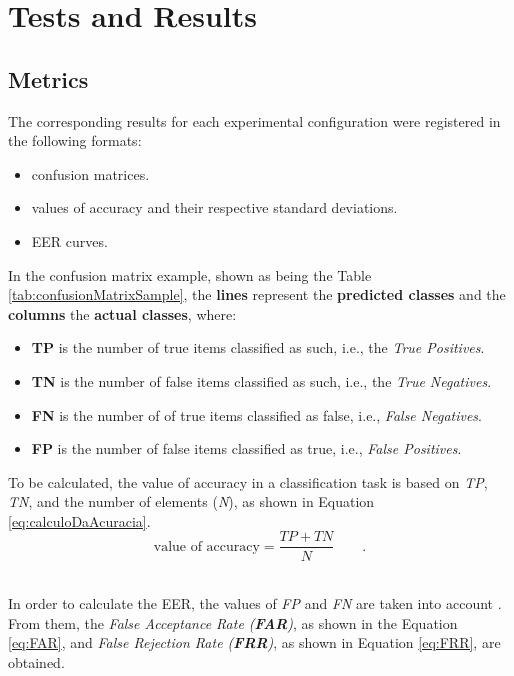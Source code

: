 \section{Tests and Results}
\label{sec:testsResults}
\subsection{Metrics}
\par The corresponding results for each experimental configuration were registered in the following formats:
		\begin{itemize}
			\item{} confusion matrices.
			\item{} values of accuracy and their respective standard deviations.
			\item{} EER curves.
		\end{itemize}
\par In the confusion matrix example, shown as being the Table \ref{tab:confusionMatrixSample}, the \textbf{lines} represent the \textbf{predicted classes} and the \textbf{columns} the \textbf{actual classes}, where:
\begin{itemize}
			\item{}\textbf{TP} is the number of true items classified as such, i.e., the \textit{True Positives}.
			\item{}\textbf{TN} is the number of false items classified as such, i.e., the \textit{True Negatives}.
			\item{}\textbf{FN} is the number of of true items classified as false, i.e., \textit{False Negatives}.
			\item{}\textbf{FP} is the number of false items classified as true, i.e., \textit{False Positives}.
		\end{itemize}

To be calculated, the value of accuracy in a classification task is based on \textit{TP}, \textit{TN}, and the number of elements (\textit{N}), as shown in Equation \ref{eq:calculoDaAcuracia}.
\\
\begin{equation}
\text{value of accuracy} = \dfrac{TP + TN}{N} \qquad.
\label{eq:calculoDaAcuracia}
\end{equation}
\\
\par In order to calculate the EER, the values of \textit{FP} and \textit{FN} are taken into account \cite{ghazali2018recent}. From them, the \textit{False Acceptance Rate (\textbf{FAR})}, as shown in the Equation \ref{eq:FAR}, and \textit{False Rejection Rate (\textbf{FRR})}, as shown in Equation \ref{eq:FRR}, are obtained.
